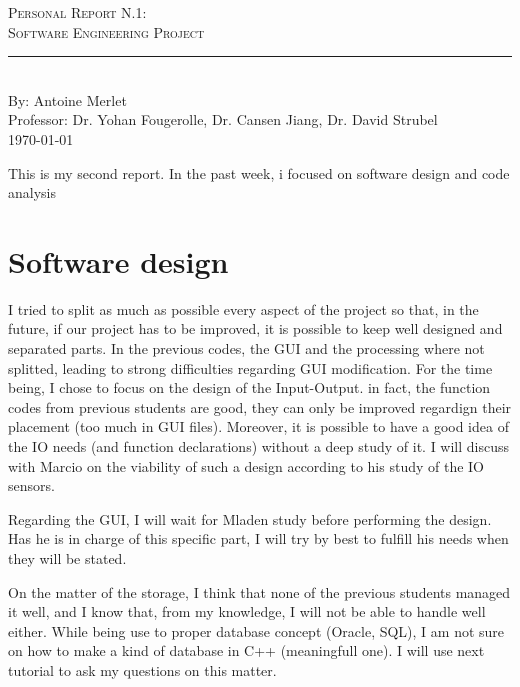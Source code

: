 \documentclass[aps,letterpaper,11pt]{revtex4}
\newcommand{\labno}{Personal Report N.1}
\newcommand{\labtitle}{Software Engineering Project}
\newcommand{\authorname}{Antoine Merlet}
\newcommand{\professor}{Dr. Yohan Fougerolle, Dr. Cansen Jiang, Dr. David Strubel}
\begin{document}
  
\begin{titlepage}
\begin{center}
{\LARGE \textsc{\labno:} \\ \vspace{4pt}}
{\Large \textsc{\labtitle} \\ \vspace{4pt}} 
\rule[13pt]{\textwidth}{1pt} \\ \vspace{150pt}
{\large By: \authorname \\ \vspace{10pt}
Professor: \professor \\ \vspace{10pt}
\today}
\end{center}




\end{titlepage}%
\newpage

This is my second report. In the past week, i focused on software design and code analysis


\section{Software design}

I tried to split as much as possible every aspect of the project so that, in the future, if our project has to be improved, it is possible to keep well designed and separated parts. In the previous codes, the GUI and the processing where not splitted, leading to strong difficulties regarding GUI modification. 
For the time being, I chose to focus on the design of the Input-Output. in fact, the function codes from previous students are good, they can only be improved regardign  their placement (too much in GUI files). Moreover, it is possible to have a good idea of the IO needs (and function declarations) without a deep study of it. I will discuss with Marcio on the viability of such a design according to his study of the IO sensors.

Regarding the GUI, I will wait for Mladen study before performing the design. Has he is in charge of this specific part, I will try by best to fulfill his needs when they will be stated.

On the matter of the storage, I think that none of the previous students managed it well, and I know that, from my knowledge, I will not be able to handle well either. While being use to proper database concept (Oracle, SQL), I am not sure on how to make a kind of database in C++ (meaningfull one). I will use next tutorial to ask my questions on this matter.
\end{document}

